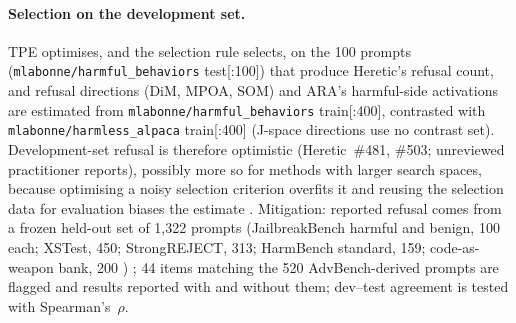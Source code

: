 \paragraph{Selection on the development set.}
TPE optimises, and the selection rule selects, on the 100 prompts
(\texttt{mlabonne/harmful\_behaviors} test[:100]) that produce Heretic's refusal
count, and refusal directions (DiM, MPOA, SOM) and ARA's harmful-side
activations are estimated from \texttt{mlabonne/harmful\_behaviors} train[:400],
contrasted with \texttt{mlabonne/harmless\_alpaca} train[:400] (J-space
directions use no contrast set). Development-set refusal is therefore optimistic
(Heretic~\#481, \#503; unreviewed practitioner reports), possibly more so for methods with larger search spaces,
because optimising a noisy selection criterion overfits it and reusing the
selection data for evaluation biases the estimate \cite{cawley2010overfitting}.
Mitigation: reported refusal
comes from a frozen held-out set of 1,322 prompts (JailbreakBench harmful and
benign, 100 each; XSTest, 450; StrongREJECT, 313; HarmBench standard, 159;
code-as-weapon bank, 200 \cite{young2026code})
\cite{chao2024jailbreakbench,rottger2024xstest,souly2024strongreject,mazeika2024harmbench}; 44 items matching
the 520 AdvBench-derived prompts are flagged and results reported with and
without them; dev--test agreement is tested with Spearman's~$\rho$.


